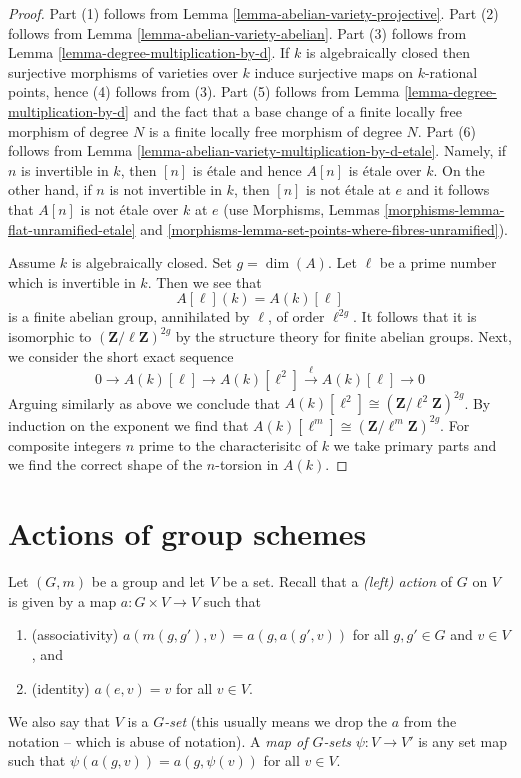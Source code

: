 \begin{proof}
Part (1) follows from Lemma \ref{lemma-abelian-variety-projective}.
Part (2) follows from Lemma \ref{lemma-abelian-variety-abelian}.
Part (3) follows from Lemma \ref{lemma-degree-multiplication-by-d}.
If $k$ is algebraically closed then surjective morphisms of varieties
over $k$ induce surjective maps on $k$-rational points, hence
(4) follows from (3).
Part (5) follows from Lemma \ref{lemma-degree-multiplication-by-d}
and the fact that a base change of a finite locally free morphism
of degree $N$ is a finite locally free morphism of degree $N$.
Part (6) follows from 
Lemma \ref{lemma-abelian-variety-multiplication-by-d-etale}.
Namely, if $n$ is invertible in $k$, then $[n]$ is \'etale
and hence $A[n]$ is \'etale over $k$.
On the other hand, if $n$ is not invertible in $k$, then
$[n]$ is not \'etale at $e$ and it follows that $A[n]$
is not \'etale over $k$ at $e$ (use
Morphisms, Lemmas \ref{morphisms-lemma-flat-unramified-etale} and
\ref{morphisms-lemma-set-points-where-fibres-unramified}).

\medskip\noindent
Assume $k$ is algebraically closed. Set $g = \dim(A)$.
Let $\ell$ be a prime number which is invertible in $k$. Then we see that
$$
A[\ell](k) = A(k)[\ell]
$$
is a finite abelian group, annihilated by $\ell$, of order $\ell^{2g}$.
It follows that it is isomorphic to $(\mathbf{Z}/\ell\mathbf{Z})^{2g}$
by the structure theory for finite abelian groups. Next, we consider
the short exact sequence
$$
0 \to A(k)[\ell] \to A(k)[\ell^2] \xrightarrow{\ell} A(k)[\ell] \to 0
$$
Arguing similarly as above we conclude that 
$A(k)[\ell^2] \cong (\mathbf{Z}/\ell^2\mathbf{Z})^{2g}$.
By induction on the exponent we find that
$A(k)[\ell^m] \cong (\mathbf{Z}/\ell^m\mathbf{Z})^{2g}$.
For composite integers $n$ prime to the characterisitc of $k$
we take primary parts and we find the correct shape of the
$n$-torsion in $A(k)$.
\end{proof}







\section{Actions of group schemes}
\label{section-action-group-scheme}

\noindent
Let $(G, m)$ be a group and let $V$ be a set.
Recall that a {\it (left) action} of $G$ on $V$ is given
by a map $a : G \times V \to V$ such that
\begin{enumerate}
\item (associativity) $a(m(g, g'), v) = a(g, a(g', v))$ for all
$g, g' \in G$ and $v \in V$, and
\item (identity) $a(e, v) = v$ for all $v \in V$.
\end{enumerate}
We also say that $V$ is a {\it $G$-set} (this usually means we
drop the $a$ from the notation -- which is abuse of notation).
A {\it map of $G$-sets} $\psi : V \to V'$ is any set map
such that $\psi(a(g, v)) = a(g, \psi(v))$ for all $v \in V$.

